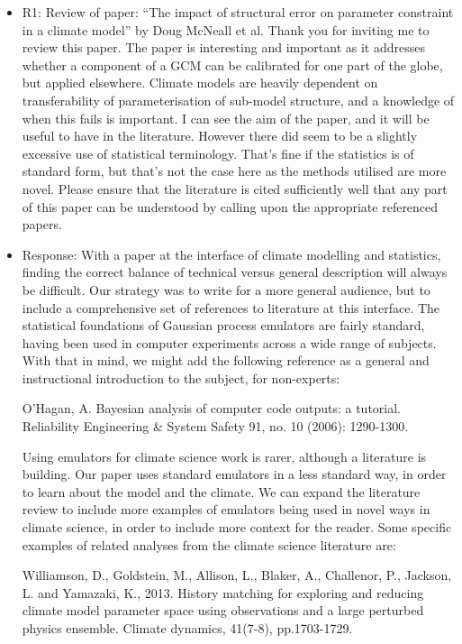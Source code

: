 \documentclass[esd, manuscript]{copernicus}
\begin{document}
\begin{itemize}
\item{R1: Review of paper: ``The impact of structural error on parameter constraint in a climate model'' by Doug McNeall et al. Thank you for inviting me to review this paper. The paper is interesting and important as it addresses whether a component of a GCM can be calibrated for one part of the globe, but applied elsewhere. Climate models are heavily dependent on transferability of parameterisation of sub-model structure, and a knowledge of when this fails is important. I can see the aim of the paper, and it will be useful to have in the literature. However there did seem to be a slightly excessive use of statistical terminology. That's fine if the statistics is of standard form, but that's not the case here as the methods utilised are more novel. Please ensure that the literature is cited sufficiently well that any part of this paper can be understood by calling upon the appropriate referenced papers.}

\item{Response: With a paper at the interface of climate modelling and statistics, finding the correct balance of technical versus general description will always be difficult. Our strategy was to write for a more general audience, but to include a comprehensive set of references to literature at this interface. The statistical foundations of Gaussian process emulators are fairly standard, having been used in computer experiments across a wide range of subjects.  With that in mind, we might add the following reference as a general and instructional introduction to the subject, for non-experts:

O'Hagan, A. Bayesian analysis of computer code outputs: a tutorial. Reliability Engineering \& System Safety 91, no. 10 (2006): 1290-1300.

Using emulators for climate science work is rarer, although a literature is building. Our paper uses standard emulators in a less standard way, in order to learn about the model and the climate. We can expand the literature review to include more examples of emulators being used in novel ways in climate science, in order to include more context for the reader. Some specific examples of related analyses from the climate science literature are:

Williamson, D., Goldstein, M., Allison, L., Blaker, A., Challenor, P., Jackson, L. and Yamazaki, K., 2013. History matching for exploring and reducing climate model parameter space using observations and a large perturbed physics ensemble. Climate dynamics, 41(7-8), pp.1703-1729.

}
\end{itemize}
\end{document}
